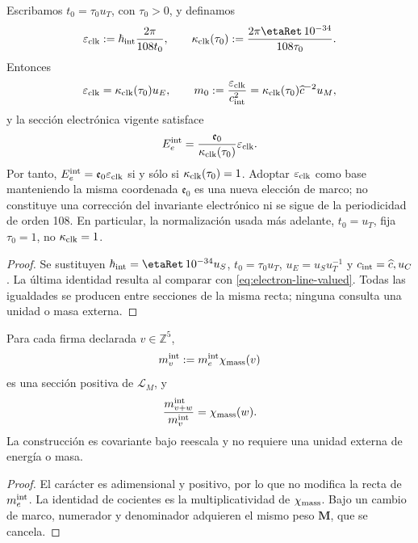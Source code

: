 \begin{proposition}
\label{prop:no-identificacion-base-reloj-rev8}
Escribamos \(t_0=\tau_0u_T\), con \(\tau_0>0\), y definamos
\[
 \varepsilon_{\rm clk}
 :=\hbar_{\rm int}\frac{2\pi}{108t_0},
 \qquad
 \kappa_{\rm clk}(\tau_0)
 :=\frac{2\pi\etaRet\,10^{-34}}{108\tau_0}.
\]
Entonces
\[
 \varepsilon_{\rm clk}=\kappa_{\rm clk}(\tau_0)u_E,
 \qquad
 m_0:=\frac{\varepsilon_{\rm clk}}{c_{\rm int}^2}
 =\kappa_{\rm clk}(\tau_0)\widehat c^{-2}u_M,
\]
y la sección electrónica vigente satisface
\[
 E_e^{\rm int}
 =\frac{\mathfrak e_0}{\kappa_{\rm clk}(\tau_0)}
  \varepsilon_{\rm clk}.
\]
Por tanto, \(E_e^{\rm int}=\mathfrak e_0\varepsilon_{\rm clk}\) si y sólo si
\(\kappa_{\rm clk}(\tau_0)=1\). Adoptar \(\varepsilon_{\rm clk}\) como base
manteniendo la misma coordenada \(\mathfrak e_0\) es una nueva elección de
marco; no constituye una corrección del invariante electrónico ni se sigue
de la periodicidad de orden 108. En particular, la normalización usada más
adelante, \(t_0=u_T\), fija \(\tau_0=1\), no
\(\kappa_{\rm clk}=1\).
\end{proposition}

\begin{proof}
Se sustituyen
\(\hbar_{\rm int}=\etaRet\,10^{-34}u_S\),
\(t_0=\tau_0u_T\), \(u_E=u_Su_T^{-1}\) y
\(c_{\rm int}=\widehat c,u_C\). La última identidad resulta al comparar
con \cref{eq:electron-line-valued}. Todas las igualdades se producen entre
secciones de la misma recta; ninguna consulta una unidad o masa externa.
\end{proof}

\begin{proposition}
Para cada firma declarada \(v\in\mathbb Z^5\),
\[
 m_v^{\rm int}:=m_e^{\rm int}\chi_{\rm mass}(v)
 \]
es una sección positiva de \(\mathcal L_M\), y
\[
 \frac{m_{v+w}^{\rm int}}{m_v^{\rm int}}
 =\chi_{\rm mass}(w).
\]
La construcción es covariante bajo reescala y no requiere una unidad externa
de energía o masa.
\end{proposition}

\begin{proof}
El carácter es adimensional y positivo, por lo que no modifica la recta de
\(m_e^{\rm int}\). La identidad de cocientes es la multiplicatividad de
\(\chi_{\rm mass}\). Bajo un cambio de marco, numerador y denominador
adquieren el mismo peso \(\mathbf M\), que se cancela.
\end{proof}

